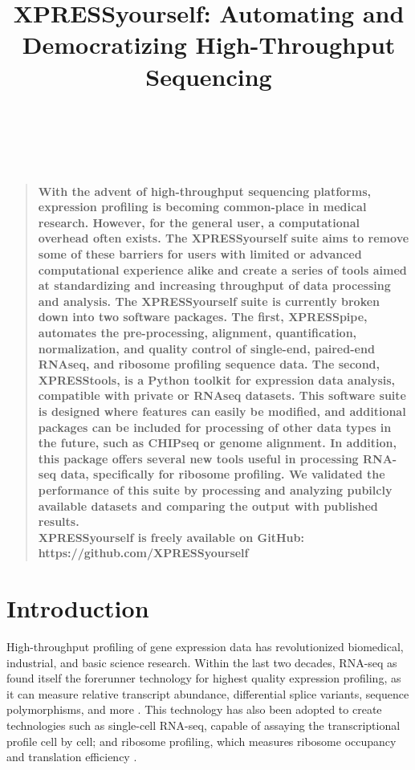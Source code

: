 \documentclass[11pt, a4paper, oneside]{article}
\title{
XPRESSyourself: Automating and Democratizing High-Throughput Sequencing
}
\author
{
\\
\\
}
\date{}
\newenvironment{sciabstract}{%
\begin{quote} \bf}
{\end{quote}}
\begin{document}
\baselineskip24pt

\maketitle





\begin{sciabstract}
With the advent of high-throughput sequencing platforms, expression profiling is becoming common-place in medical research. However, for the general user, a computational overhead often exists. The XPRESSyourself suite aims to remove some of these barriers for users with limited or advanced computational experience alike and create a series of tools aimed at standardizing and increasing throughput of data processing and analysis. The XPRESSyourself suite is currently broken down into two software packages. The first, XPRESSpipe, automates the pre-processing, alignment, quantification, normalization, and quality control of single-end, paired-end RNAseq, and ribosome profiling sequence data. The second, XPRESStools, is a Python toolkit for expression data analysis, compatible with private or RNAseq datasets. This software suite is designed where features can easily be modified, and additional packages can be included for processing of other data types in the future, such as CHIPseq or genome alignment. In addition, this package offers several new tools useful in processing RNA-seq data, specifically for ribosome profiling. We validated the performance of this suite by processing and analyzing pubilcly available datasets and comparing the output with published results.
\newline\\
\normalfont XPRESSyourself is freely available on GitHub: https://github.com/XPRESSyourself\\
\end{sciabstract}


\section{Introduction}

High-throughput profiling of gene expression data has revolutionized biomedical, industrial, and basic science research. Within the last two decades, RNA-seq as found itself the forerunner technology for highest quality expression profiling, as it can measure relative transcript abundance, differential splice variants, sequence polymorphisms, and more \cite{byron_nrg}. This technology has also been adopted to create technologies such as single-cell RNA-seq, capable of assaying the transcriptional profile cell by cell; and ribosome profiling, which measures ribosome occupancy and translation efficiency \cite{ingolia_science}.
\end{document}
